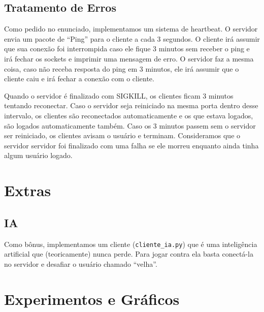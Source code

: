 \documentclass[12pt]{beamer}
\begin{document}
\subsection{Tratamento de Erros}
\begin{frame}
  Como pedido no enunciado, implementamos um sistema de heartbeat. O servidor envia um pacote de ``Ping'' para o cliente a cada 3 segundos. O cliente irá assumir que sua conexão foi interrompida caso ele fique 3 minutos sem receber o ping e irá fechar os sockets e imprimir uma mensagem de erro. O servidor faz a mesma coisa, caso não receba resposta do ping em 3 minutos, ele irá assumir que o cliente caiu e irá fechar a conexão com o cliente.
\end{frame}
\begin{frame}
  Quando o servidor é finalizado com SIGKILL, os clientes ficam 3 minutos tentando reconectar. Caso o servidor seja reiniciado na mesma porta dentro desse intervalo, os clientes são reconectados automaticamente e os que estava logados, são logados automaticamente também. Caso os 3 minutos passem sem o servidor ser reiniciado, os clientes avisam o usuário e terminam. Consideramos que o servidor servidor foi finalizado com uma falha se ele morreu enquanto ainda tinha algum usuário logado.
\end{frame}

\section{Extras}
\subsection{IA}
\begin{frame}
  Como bônus, implementamos um cliente (\texttt{cliente\_ia.py}) que é uma inteligência artificial que (teoricamente) nunca perde. Para jogar contra ela basta conectá-la no servidor e desafiar o usuário chamado ``velha''.
\end{frame}

\section{Experimentos e Gráficos}
\end{document}
